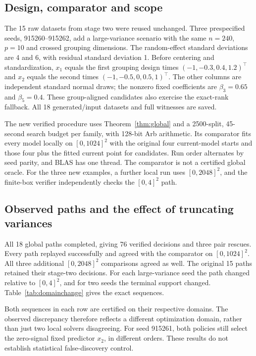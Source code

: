 \documentclass[11pt,a4paper]{article}
\theoremstyle{remark}\newtheorem{remark}[theorem]{Remark}
\begin{document}
\subsection{Design, comparator and scope}
The 15 raw datasets from stage two were reused unchanged. Three prespecified
seeds, 915260--915262, add a large-variance scenario with the same $n=240$, $p=10$
and crossed grouping dimensions. The random-effect standard deviations are 4 and
6, with residual standard deviation 1. Before centering and standardization,
$x_1$ equals the first grouping design times $(-1,-0.3,0.4,1.2)^\top$ and $x_2$
equals the second times $(-1,-0.5,0,0.5,1)^\top$. The other columns are independent
standard normal draws; the nonzero fixed coefficients are $\beta_3=0.65$ and
$\beta_5=0.4$. These group-aligned candidates also exercise the exact-rank fallback.
All 18 generated/input datasets and full witnesses are saved.

The new verified procedure uses Theorem~\ref{thm:global} and a 2500-split,
45-second search budget per family, with 128-bit Arb arithmetic. Its comparator
fits every model locally on $[0,1024]^2$ with the original four current-model
starts and those four plus the fitted current point for candidates. Run order
alternates by seed parity, and BLAS has one thread. The comparator is not a
certified global oracle. For the three new examples, a further local run uses
$[0,2048]^2$, and the finite-box verifier independently checks the $[0,4]^2$ path.

\subsection{Observed paths and the effect of truncating variances}
All 18 global paths completed, giving 76 verified decisions and three pair
rescues. Every path replayed successfully and agreed with the comparator on
$[0,1024]^2$. All three additional $[0,2048]^2$ comparisons agreed as well.
The original 15 paths retained their stage-two decisions. For each large-variance
seed the path changed relative to $[0,4]^2$, and for two seeds the terminal support
changed. Table~\ref{tab:domainchange} gives the exact sequences.




Both sequences in each row are certified on their respective domains. The
observed discrepancy therefore reflects a different optimization domain, rather
than just two local solvers disagreeing. For seed 915261, both policies still
select the zero-signal fixed predictor $x_2$, in different orders. These results
do not establish statistical false-discovery control.
\end{document}
